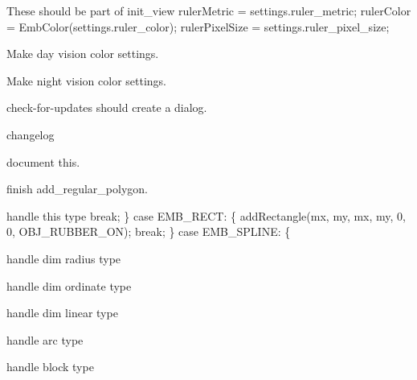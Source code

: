 
\begin{DoxyRefList}
\item[Member \mbox{\hyperlink{imgui__main_8c_af6840ec2e5976c6e8bdab0e47abe9651}{actuator}} (char command\+\_\+line\mbox{[}200\mbox{]})]\label{todo__todo000104}%
%
These should be part of init\+\_\+view ruler\+Metric = settings.\+ruler\+\_\+metric; ruler\+Color = Emb\+Color(settings.\+ruler\+\_\+color); ruler\+Pixel\+Size = settings.\+ruler\+\_\+pixel\+\_\+size; 

\label{todo__todo000100}%
%
Make day vision color settings.

\label{todo__todo000103}%
%
Make night vision color settings. 

\label{todo__todo000101}%
%
check-\/for-\/updates should create a dialog.

\label{todo__todo000102}%
%
changelog  
\item[Member \mbox{\hyperlink{imgui__main_8c_a5ef9b23d5b62a96a6c4b331da1079d64}{add\+\_\+point\+\_\+action}} (void)]\label{todo__todo000150}%
%
document this.  
\item[Member \mbox{\hyperlink{imgui__main_8c_a3c2b6959a746a022c29706c395d774f5}{add\+\_\+regular\+\_\+polygon}} (Emb\+Real centerX, Emb\+Real centerY, int sides, int mode, Emb\+Real rad, Emb\+Real rot, bool fill)]\label{todo__todo000189}%
%
finish add\+\_\+regular\+\_\+polygon.  
\item[Member \mbox{\hyperlink{imgui__main_8c_a417741c3dbb48336d29bcb2f1c1b58f9}{add\+\_\+rubber\+\_\+action}} (void)]\label{todo__todo000136}%
%
handle this type break; \} case EMB\+\_\+\+RECT\+: \{ add\+Rectangle(mx, my, mx, my, 0, 0, OBJ\+\_\+\+RUBBER\+\_\+\+ON); break; \} case EMB\+\_\+\+SPLINE\+: \{ 

\label{todo__todo000135}%
%
handle dim radius type 

\label{todo__todo000134}%
%
handle dim ordinate type

\label{todo__todo000133}%
%
handle dim linear type

\label{todo__todo000132}%
%
handle arc type 



handle block type 




\end{DoxyRefList}
